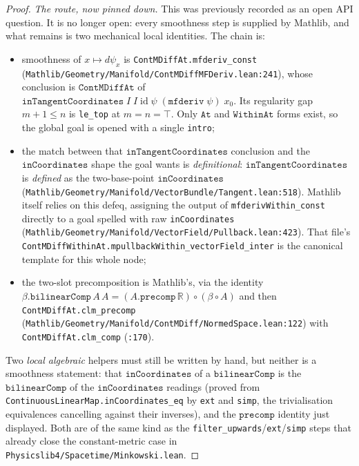 \begin{proof}
    \emph{The route, now pinned down.} This was previously recorded as an open API question. It is no longer open: every smoothness step is supplied by Mathlib, and what remains is two mechanical local identities. The chain is:
    \begin{itemize}
        \item smoothness of $x \mapsto d\psi_x$ is \texttt{ContMDiffAt.mfderiv\_const} (\texttt{Mathlib/Geometry/Manifold/ContMDiffMFDeriv.lean:241}), whose conclusion is $\mathtt{ContMDiffAt}$ of $\mathtt{inTangentCoordinates}\;I\;I\;\mathrm{id}\;\psi\;(\mathtt{mfderiv}\;\psi)\;x_0$. Its regularity gap $m + 1 \le n$ is \texttt{le\_top} at $m = n = \top$. Only $\mathtt{At}$ and $\mathtt{WithinAt}$ forms exist, so the global goal is opened with a single \texttt{intro};
        \item the match between that $\mathtt{inTangentCoordinates}$ conclusion and the $\mathtt{inCoordinates}$ shape the goal wants is \emph{definitional}: $\mathtt{inTangentCoordinates}$ is \emph{defined} as the two-base-point $\mathtt{inCoordinates}$ (\texttt{Mathlib/Geometry/Manifold/VectorBundle/Tangent.lean:518}). Mathlib itself relies on this defeq, assigning the output of \texttt{mfderivWithin\_const} directly to a goal spelled with raw \texttt{inCoordinates} (\texttt{Mathlib/Geometry/Manifold/VectorField/Pullback.lean:423}). That file's \texttt{ContMDiffWithinAt.mpullbackWithin\_vectorField\_inter} is the canonical template for this whole node;
        \item the two-slot precomposition is Mathlib's, via the identity $\beta.\mathtt{bilinearComp}\,A\,A = (A.\mathtt{precomp}\,\mathbb{R}) \circ (\beta \circ A)$ and then \texttt{ContMDiffAt.clm\_precomp} (\texttt{Mathlib/Geometry/Manifold/ContMDiff/NormedSpace.lean:122}) with \texttt{ContMDiffAt.clm\_comp} (\texttt{:170}).
    \end{itemize}
    Two \emph{local algebraic} helpers must still be written by hand, but neither is a smoothness statement: that $\mathtt{inCoordinates}$ of a $\mathtt{bilinearComp}$ is the $\mathtt{bilinearComp}$ of the $\mathtt{inCoordinates}$ readings (proved from \texttt{ContinuousLinearMap.inCoordinates\_eq} by \texttt{ext} and \texttt{simp}, the trivialisation equivalences cancelling against their inverses), and the $\mathtt{precomp}$ identity just displayed. Both are of the same kind as the \texttt{filter\_upwards}/\texttt{ext}/\texttt{simp} steps that already close the constant-metric case in \texttt{Physicslib4/Spacetime/Minkowski.lean}.


\end{proof}
